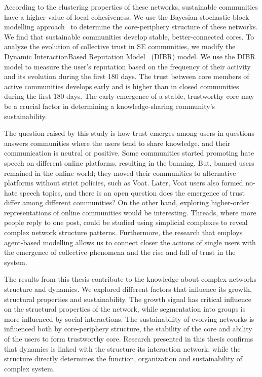 According to the clustering properties of these networks, sustainable communities have a higher value of local cohesiveness. We use the Bayesian stochastic block modelling approach~\cite{gallagher2020clarified} to determine the core-periphery structure of these networks. We find that sustainable communities develop stable, better-connected cores. To analyze the evolution of collective trust in SE communities, we modify the Dynamic InteractionBased Reputation Model~\cite{melnikov2018toward} (DIBR) model. We use the DIBR model to measure the user's reputation based on the frequency of their activity and its evolution during the first 180 days. The trust between core members of active communities develops early and is higher than in closed communities during the first 180 days. The early emergence of a stable, trustworthy core may be a crucial factor in determining a knowledge-sharing community's sustainability. 

The question raised by this study is how trust emerges among users in questions answers communities where the users tend to share knowledge, and their communication is neutral or positive. Some communities started promoting hate speech on different online platforms, resulting in the banning. But, banned users remained in the online world; they moved their communities to alternative platforms without strict policies, such as Voat. Later, Voat users also formed no-hate speech topics, and there is an open question does the emergence of trust differ among different communities? On the other hand, exploring higher-order representations of online communities would be interesting. Threads, where more people reply to one post, could be studied using simplicial complexes to reveal complex network structure patterns. Furthermore, the research that employs agent-based modelling allows us to connect closer the actions of single users with the emergence of collective phenomena and the rise and fall of trust in the system. 

The results from this thesis contribute to the knowledge about complex networks structure and dynamics. We explored different factors that influence its growth, structural properties and sustainability. The growth signal has critical influence on the structural properties of the network, while segmentation into groups is more influenced by social interactions. The sustainability of evolving networks is influenced both by core-periphery structure, the stability of the core and ability of the users to form trustworthy core. Research presented in this thesis confirms that dynamics is linked with the structure its interaction network, while the structure directly determines the function, organization and sustainability of complex system.  

